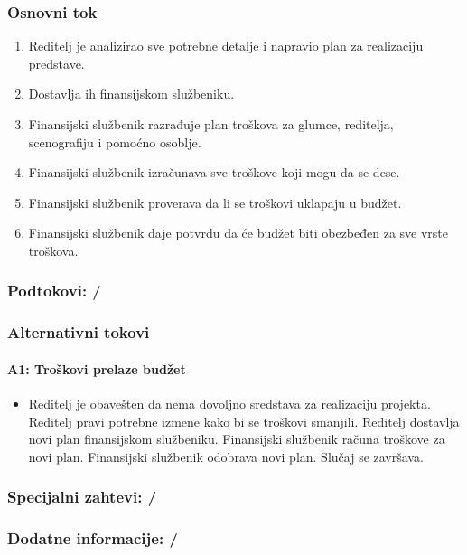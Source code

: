 \subsubsection*{Osnovni tok}
\begin{enumerate}
    \item Reditelj je analizirao sve potrebne detalje i napravio plan za realizaciju predstave.
    \item Dostavlja ih finansijskom službeniku.
    \item Finansijski službenik razrađuje plan troškova za glumce, reditelja, scenografiju i pomoćno osoblje.
    \item Finansijski službenik izračunava sve troškove koji mogu da se dese.
    \item Finansijski službenik proverava da li se troškovi uklapaju u budžet.
    \item Finansijski službenik daje potvrdu da će budžet biti obezbeđen za sve vrste troškova.
\end{enumerate}

\subsubsection*{Podtokovi: /}

\subsubsection*{Alternativni tokovi}

\paragraph*{A1: Troškovi prelaze budžet}
\begin{itemize}
    \item Reditelj je obavešten da nema dovoljno sredstava za realizaciju projekta. Reditelj pravi potrebne izmene kako bi se troškovi smanjili. Reditelj dostavlja novi plan finansijskom službeniku. Finansijski službenik računa troškove za novi plan. Finansijski službenik odobrava novi plan. Slučaj se završava.
\end{itemize}

\subsubsection*{Specijalni zahtevi: /}

\subsubsection*{Dodatne informacije: /}

